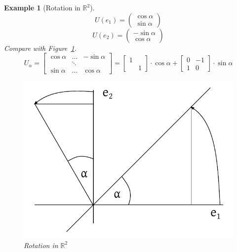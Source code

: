 \documentclass{article}
\newtheorem{example}{Example}  \numberwithin{example}{section}
\newcommand{\vectwo}[2]{\begin{pmatrix} #1 \\ #2 \end{pmatrix}}
\begin{document}
\begin{example}[Rotation in $\mathbb R^2$]
  \[ U(e_1) = \vectwo{\cos\alpha}{\sin\alpha} \]
  \[ U(e_2) = \vectwo{-\sin\alpha}{\cos\alpha} \]
  Compare with Figure~\ref{img:rotr2}.
  \[
    U_{\alpha} = \begin{bmatrix}
      \cos\alpha & \dots & -\sin\alpha \\
                 & \ddots & \\
      \sin\alpha & \dots & \cos\alpha
    \end{bmatrix}
    = \begin{bmatrix} 1 & \\ & 1 \end{bmatrix} \cdot \cos{\alpha} + \begin{bmatrix} 0 & -1 \\ 1 & 0 \end{bmatrix} \cdot \sin\alpha
  \]
  \begin{figure}[t]
    \begin{center}
      \includegraphics{img/13_rotation.pdf}
      \caption{Rotation in $\mathbb R^2$}
      \label{img:rotr2}
    \end{center}
  \end{figure}
\end{example}
\end{document}
